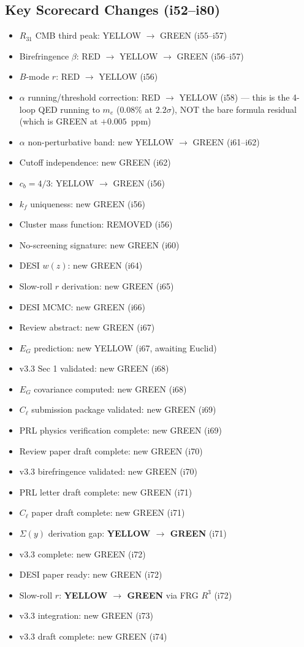 \documentclass[11pt,a4paper]{article}
\begin{document}
\subsection{Key Scorecard Changes (i52--i80)}
\begin{itemize}[nosep]
\item $R_{31}$ CMB third peak: YELLOW $\to$ GREEN (i55--i57)
\item Birefringence $\beta$: RED $\to$ YELLOW $\to$ GREEN (i56--i57)
\item $B$-mode $r$: RED $\to$ YELLOW (i56)
\item $\alpha$ running/threshold correction: RED $\to$ YELLOW (i58) --- this is the 4-loop QED running to $m_e$ ($0.08\%$ at $2.2\sigma$), NOT the bare formula residual (which is GREEN at $+0.005$~ppm)
\item $\alpha$ non-perturbative band: new YELLOW $\to$ GREEN (i61--i62)
\item Cutoff independence: new GREEN (i62)
\item $c_b = 4/3$: YELLOW $\to$ GREEN (i56)
\item $k_f$ uniqueness: new GREEN (i56)
\item Cluster mass function: REMOVED (i56)
\item No-screening signature: new GREEN (i60)
\item DESI $w(z)$: new GREEN (i64)
\item Slow-roll $r$ derivation: new GREEN (i65)
\item DESI MCMC: new GREEN (i66)
\item Review abstract: new GREEN (i67)
\item $E_G$ prediction: new YELLOW (i67, awaiting Euclid)
\item v3.3 Sec 1 validated: new GREEN (i68)
\item $E_G$ covariance computed: new GREEN (i68)
\item $C_\ell$ submission package validated: new GREEN (i69)
\item PRL physics verification complete: new GREEN (i69)
\item Review paper draft complete: new GREEN (i70)
\item v3.3 birefringence validated: new GREEN (i70)
\item PRL letter draft complete: new GREEN (i71)
\item $C_\ell$ paper draft complete: new GREEN (i71)
\item $\Sigma(y)$ derivation gap: \textbf{YELLOW $\to$ GREEN} (i71)
\item v3.3 complete: new GREEN (i72)
\item DESI paper ready: new GREEN (i72)
\item Slow-roll $r$: \textbf{YELLOW $\to$ GREEN} via FRG $R^3$ (i72)
\item v3.3 integration: new GREEN (i73)
\item v3.3 draft complete: new GREEN (i74)
\end{itemize}
\end{document}

